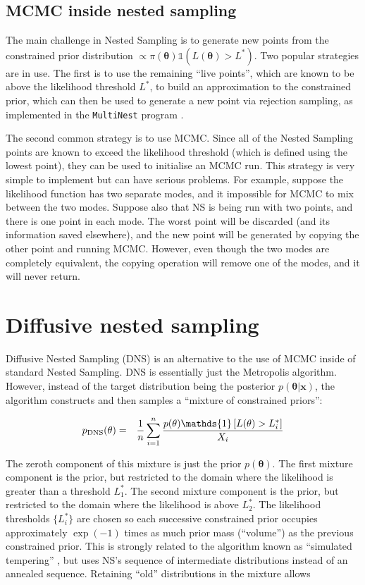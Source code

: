\documentclass[
  ,final            %
  ]
  {aipproc}
\newcommand{\pars}{\boldsymbol{\theta}}
\newcommand{\data}{\mathbf{x}}
\begin{document}
\subsection{MCMC inside nested sampling}
The main challenge in Nested Sampling is to generate new points from the
constrained prior distribution $\propto \pi(\pars)\mathds{1}(L(\pars) > L^*)$.
Two popular strategies are in use. The first is to use the remaining ``live
points'', which are known to be above the likelihood threshold $L^*$, to build
an approximation to the constrained prior, which can then be used to generate
a new point via rejection sampling, as implemented in the
{\tt MultiNest} program \citep{multinest}.

The second common strategy is to use MCMC. Since all of the Nested Sampling
points are
known to exceed the likelihood threshold (which is defined using the lowest
point), they can be used to initialise an
MCMC run. This strategy is very simple to implement but can have
serious problems. For example,
suppose the likelihood function has two separate modes, and it impossible for
MCMC to mix between the two modes. Suppose also that NS is being run with two
points, and there is one point in each mode. The worst point will be discarded
(and its information saved elsewhere), and the new point will be generated by
copying the other point and running MCMC. However, even though the two modes
are completely equivalent, the copying operation will remove one of the modes,
and it will never return.

\section{Diffusive nested sampling}
Diffusive Nested Sampling (DNS) is an alternative to the use of MCMC inside of
standard Nested Sampling. DNS is essentially just the Metropolis algorithm.
However, instead of the
target distribution being the posterior $p(\pars|\data)$, the algorithm
constructs and then samples a ``mixture of constrained priors'':

\begin{eqnarray}
p_{\rm DNS}(\theta) &=& \frac{1}{n}\sum_{i=1}^n
\frac{p(\theta)\mathds{1}\left[L(\theta) > L^*_i\right]}{X_i}
\end{eqnarray}

The zeroth component of this mixture is just the prior $p(\pars)$. The first
mixture component is the prior, but restricted to the domain where the
likelihood is greater than a threshold $L^*_1$. The second mixture component
is the prior, but restricted to the domain where the likelihood is above
$L^*_2$. The likelihood thresholds $\{ L^*_i \}$ are chosen so each
successive constrained prior occupies approximately $\exp(-1)$ times as much
prior mass (``volume'') as the previous constrained prior. This is strongly
related to the algorithm known as ``simulated tempering''
\citep{simulated_tempering}, but uses NS's
sequence of intermediate distributions instead of an annealed sequence.
Retaining ``old'' distributions in the mixture allows 
\end{document}
